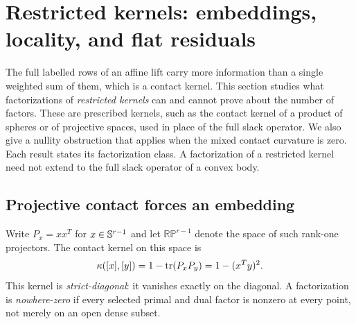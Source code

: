 \section{Restricted kernels: embeddings, locality, and flat residuals}
\label{sec:restricted-kernels}
The full labelled rows of an affine lift carry more information than a
single weighted sum of them, which is a contact kernel. This section
studies what factorizations of \emph{restricted kernels} can and cannot
prove about the number of factors. These are prescribed kernels, such as
the contact kernel of a product of spheres or of projective spaces, used
in place of the full slack operator. We also give a nullity obstruction
that applies when the mixed contact curvature is zero. Each result
states its factorization class. A factorization of a restricted kernel
need not extend to the full slack operator of a convex body.

\subsection{Projective contact forces an embedding}
Write $P_x=xx^T$ for $x\in\mathbb S^{r-1}$ and let
$\mathbb{RP}^{r-1}$ denote the space of such rank-one projectors. The
contact kernel on this space is
\[
 \kappa([x],[y])=1-\operatorname{tr}(P_xP_y)=1-(x^Ty)^2.
\]
This kernel is \emph{strict-diagonal}: it vanishes exactly on the
diagonal. A factorization is \emph{nowhere-zero} if every selected primal
and dual factor is nonzero at every point, not merely on an open dense
subset.

